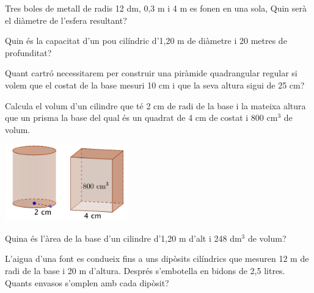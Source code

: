 \begin{activitats}
\begin{mylist}

\exer  Tres boles de metall de radis 12 dm, 0,3 m i 4 m es fonen en una sola, Quin serà el diàmetre de l'esfera resultant?


\exer  Quin és la capacitat d'un pou cilíndric d'1,20 m de diàmetre i 20 metres de profunditat?

 
\exer  Quant cartró necessitarem per construir una piràmide quadrangular regular si volem que el costat de la base mesuri 10 cm i que la seva altura sigui de 25 cm?


\exer  Calcula el volum d'un cilindre que té 2 cm de radi de la base i la mateixa altura que un prisma la base del qual és un quadrat de 4 cm de costat i 800 cm${}^{3}$ de volum.

\begin{center}
	\includegraphics[width=0.4\textwidth]{img-11/pp}
\end{center}


\exer  Quina és l'àrea de la base d'un cilindre d'1,20 m d'alt i 248 dm${}^{3}$ de volum?


\exer  L'aigua d'una font es condueix fins a uns dipòsits cilíndrics que mesuren 12 m de radi de la base i 20 m d'altura. Després s'embotella en bidons de 2,5 litres. Quants envasos s'omplen amb cada dipòsit? 


\end{mylist}
\end{activitats}

